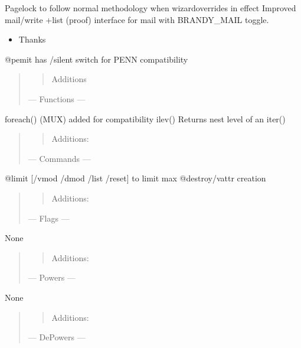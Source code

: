 \documentclass[letterpaper,10pt,english]{sphinxmanual}
\begin{document}
\sphinxAtStartPar
Pagelock to follow normal methodology when wizard\sphinxhyphen{}overrides in effect
Improved mail/write +list (proof) interface for mail with BRANDY\_MAIL toggle.
\begin{itemize}
\item {} 
\sphinxAtStartPar
Thanks 

\end{itemize}

\sphinxAtStartPar
@pemit has /silent switch for PENN compatibility
\begin{quote}
\begin{quote}

\sphinxAtStartPar
Additions
\end{quote}

\sphinxAtStartPar
— Functions —
\end{quote}

\sphinxAtStartPar
foreach() \sphinxhyphen{} (MUX) added for compatibility
ilev() \sphinxhyphen{} Returns nest level of an iter()
\begin{quote}
\begin{quote}

\sphinxAtStartPar
Additions:
\end{quote}

\sphinxAtStartPar
— Commands —
\end{quote}

\sphinxAtStartPar
@limit {[}/vmod /dmod /list /reset{]} \sphinxhyphen{} to limit max @destroy/vattr creation
\begin{quote}
\begin{quote}

\sphinxAtStartPar
Additions:
\end{quote}

\sphinxAtStartPar
— Flags —
\end{quote}

\sphinxAtStartPar
None
\begin{quote}
\begin{quote}

\sphinxAtStartPar
Additions:
\end{quote}

\sphinxAtStartPar
— Powers —
\end{quote}

\sphinxAtStartPar
None
\begin{quote}
\begin{quote}

\sphinxAtStartPar
Additions:
\end{quote}

\sphinxAtStartPar
— De\sphinxhyphen{}Powers —
\end{quote}
\end{document}
